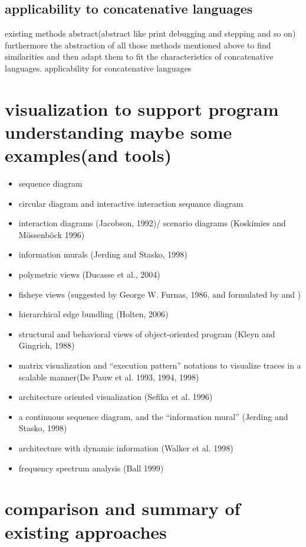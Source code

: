 \subsection{applicability to concatenative languages}

existing methods abstract(abstract like print debugging and stepping and so on) furthermore the abstraction of all those methods mentioned above to find similarities and then adapt them to fit the characteristics of concatenative languages.
applicability for concatenative languages

\section{visualization to support program understanding maybe some examples(and tools)}

\begin{itemize}
\item sequence diagram
\item circular diagram and interactive interaction sequance diagram \cite{Cornelissen2009}
\item interaction diagrams (Jacobson, 1992)/ scenario diagrams (Koskimies and Mössenböck 1996)
\item information murals (Jerding and Stasko, 1998)
\item polymetric views (Ducasse et al., 2004)
\item fisheye views (suggested by George W. Furnas, 1986, and formulated by \cite{Storey:1995:GLA:647547.728600} and \cite{Sarkar:1994:GFV:198366.198384})
\item hierarchical edge bundling (Holten, 2006)
\item structural and behavioral views of object-oriented program (Kleyn and Gingrich, 1988)
\item matrix visualization and “execution pattern” notations \cite{Pauw98executionpatterns} to visualize traces in a scalable manner(De Pauw et al. 1993, 1994, 1998) 
\item architecture oriented visualization (Sefika et al. 1996)
\item a continuous sequence diagram, and the “information mural” (Jerding and Stasko, 1998)
\item architecture with dynamic information (Walker et al. 1998)
\item frequency spectrum analysis (Ball 1999)
\end{itemize}

\section{comparison and summary of existing approaches}

